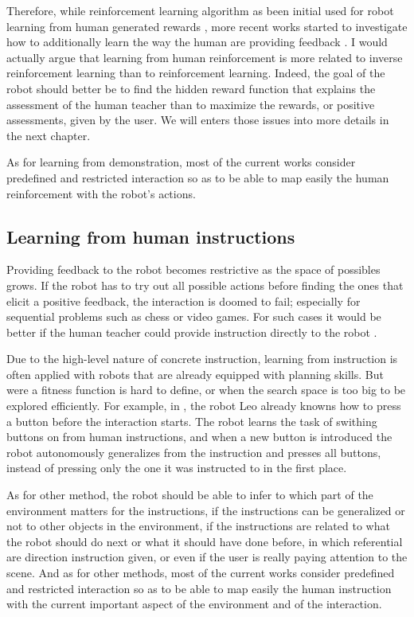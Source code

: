 Therefore, while reinforcement learning algorithm as been initial used for robot learning from human generated rewards \cite{thomaz2008teachable}, more recent works started to investigate how to additionally learn the way the human are providing feedback \cite{knox2009interactively}. I would actually argue that learning from human reinforcement is more related to inverse reinforcement learning than to reinforcement learning. Indeed, the goal of the robot should better be to find the hidden reward function that explains the assessment of the human teacher than to maximize the rewards, or positive assessments, given by the user. We will enters those issues into more details in the next chapter.

As for learning from demonstration, most of the current works consider predefined and restricted interaction so as to be able to map easily the human reinforcement with the robot's actions.

\subsection{Learning from human instructions}

Providing feedback to the robot becomes restrictive as the space of possibles grows. If the robot has to try out all possible actions before finding the ones that elicit a positive feedback, the interaction is doomed to fail; especially for sequential problems such as chess or video games. For such cases it would be better if the human teacher could provide instruction directly to the robot \cite{breazeal2004tutelage}.

Due to the high-level nature of concrete instruction, learning from instruction is often applied with robots that are already equipped with planning skills. But were a fitness function is hard to define, or when the search space is too big to be explored efficiently. For example, in \cite{lockerd2004tutelage}, the robot Leo already knowns how to press a button before the interaction starts. The robot learns the task of swithing buttons on from human instructions, and when a new button is introduced the robot autonomously generalizes from the instruction and presses all buttons, instead of pressing only the one it was instructed to in the first place. 

As for other method, the robot should be able to infer to which part of the environment matters for the instructions, if the instructions can be generalized or not to other objects in the environment, if the instructions are related to what the robot should do next or what it should have done before, in which referential are direction instruction given, or even if the user is really paying attention to the scene. And as for other methods, most of the current works consider predefined and restricted interaction so as to be able to map easily the human instruction with the current important aspect of the environment and of the interaction.

